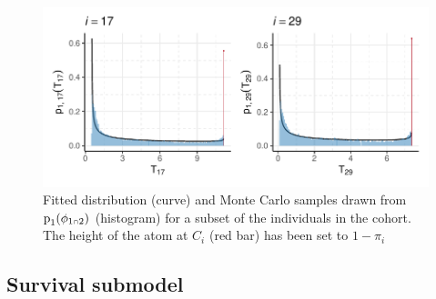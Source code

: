 \documentclass[
  10pt,
  a4paper,
]{article}
\let\Oldcap\cap
\renewcommand{\cap}{\mathrel{\mathsmaller{\Oldcap}}}
\newcommand{\pd}{\text{p}}
\begin{document}
\begin{figure}

{\centering \includegraphics{../plots/mimic-example/pf-prior-plot-small} 

}

\caption{Fitted distribution (curve) and Monte Carlo samples drawn from $\pd_{1}(\phi_{1 \cap 2})$ (histogram) for a subset of the individuals in the cohort. The height of the atom at $C_{i}$ (red bar) has been set to $1 - \widehat{\pi}_{i}$}\label{fig:pf_prior_fit}
\end{figure}

\hypertarget{survival-submodel}{%
\subsection{Survival submodel}\label{survival-submodel}}
\end{document}
